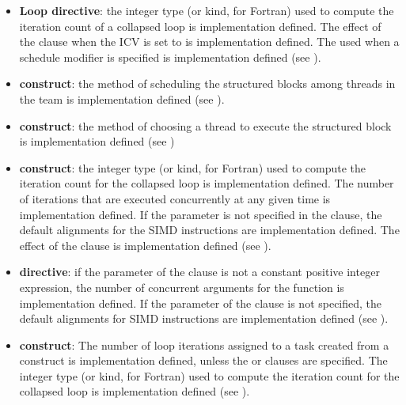 \begin{itemize}
\item \textbf{Loop directive}: the integer type (or kind, for Fortran) used to compute the iteration 
count of a collapsed loop is implementation defined. The effect of the 
 clause when the  ICV is set to  is 
implementation defined. The  used when a 
schedule modifier is specified is implementation defined (see ).

\item {} \textbf{construct}: the method of scheduling the structured blocks among threads 
in the team is implementation defined (see ).

\item {} \textbf{construct}: the method of choosing a thread to execute the structured block 
is implementation defined (see )

\item {} \textbf{construct}: the integer type (or kind, for
  Fortran) used to compute the iteration count for the collapsed loop
  is implementation defined. The number of iterations that are
  executed concurrently at any given time is implementation
  defined. If the  parameter is not specified in the
   clause, the default alignments for the SIMD
  instructions are implementation defined.
  The effect of the  clause is implementation defined
  (see ).

\item {} \textbf{directive}: if the parameter of the
   clause is not a constant positive integer expression,
  the number of concurrent arguments for the function is
  implementation defined. If the  parameter of the
   clause is not specified, the default alignments for
  SIMD instructions are implementation defined (see
  ).

\item {} \textbf{construct}: The number of loop
  iterations assigned to a task created from a 
  construct is implementation defined, unless the  or
   clauses are specified. The integer type (or kind,
  for Fortran) used to compute the iteration count for the collapsed
  loop is implementation defined (see ).


\end{itemize}

